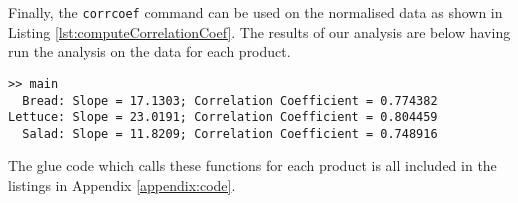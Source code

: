 Finally, the \texttt{corrcoef} command can be used on the normalised data as shown in Listing \ref{lst:computeCorrelationCoef}. The results of our analysis are below having run the analysis on the data for each product.


\begin{verbatim}
>> main
  Bread: Slope = 17.1303; Correlation Coefficient = 0.774382
Lettuce: Slope = 23.0191; Correlation Coefficient = 0.804459
  Salad: Slope = 11.8209; Correlation Coefficient = 0.748916
\end{verbatim}

The glue code which calls these functions for each product is all included in the listings in Appendix \ref{appendix:code}.
